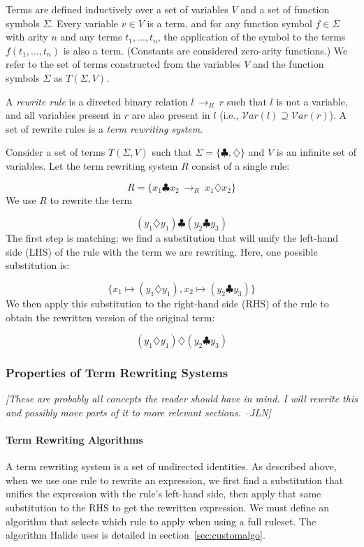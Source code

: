 \documentclass[acmsmall,review]{acmart}\settopmatter{printfolios=true,printccs=false,printacmref=false}
\newcommand{\jln}[1]{\textcolor{uwpurple}{\textit{[{#1} --JLN]}}}
\newcommand{\rewrites}[0]{\:\rightarrow_{R}\:}
\begin{document}
Terms are defined inductively over a set of variables $V$ and a set of function symbols $\Sigma$. Every variable $v \in V$ is a term, and for any function symbol $f \in \Sigma$ with arity $n$ and any terms $t_1, ..., t_n$, the application of the symbol to the terms $f(t_1, ..., t_n)$ is also a term. (Constants are considered zero-arity functions.) We refer to the set of terms constructed from the variables $V$ and the function symbols $\Sigma$ as $T(\Sigma, V)$.

A \emph{rewrite rule} is a directed binary relation $l \rewrites r$ such that $l$ is not a variable, and all variables present in $r$ are also present in $l$ (i.e., $\mathcal{V}ar(l) \supseteq \mathcal{V}ar(r)$). A set of rewrite rules is a \emph{term rewriting system}.

Consider a set of terms $T(\Sigma, V)$ such that $\Sigma = \{\clubsuit, \diamondsuit\}$ and $V$ is an infinite set of variables. Let the term rewriting system $R$ consist of a single rule:

\[ R = \{ x_1 \clubsuit x_2 \rewrites x_1 \diamondsuit x_2 \} \]
We use $R$ to rewrite the term

\[ 
(y_1 \diamondsuit y_1) \clubsuit (y_2 \clubsuit y_3)
\]
The first step is matching; we find a substitution that will unify the left-hand side (LHS) of the rule with the term we are rewriting. Here, one possible substitution is:

\[
\{ x_1 \mapsto (y_1 \diamondsuit y_1), x_2 \mapsto (y_2 \clubsuit y_3) \}
\]
We then apply this substitution to the right-hand side (RHS) of the rule to obtain the rewritten version of the original term:

\[ 
(y_1 \diamondsuit y_1) \diamondsuit (y_2 \clubsuit y_3)
\]

\subsubsection{Properties of Term Rewriting Systems}
\jln{These are probably all concepts the reader should have in mind. I will rewrite this and possibly move parts of it to more relevant sections.}

\paragraph{Term Rewriting Algorithms}
A term rewriting system is a set of undirected identities. As described above, when we use one rule to rewrite an expression, we first find a substitution that unifies the expression with the rule's left-hand side, then apply that same substitution to the RHS to get the rewritten expression. We must define an algorithm that selects which rule to apply when using a full ruleset. The algorithm Halide uses is detailed in section~\ref{sec:customalgo}.
\end{document}
